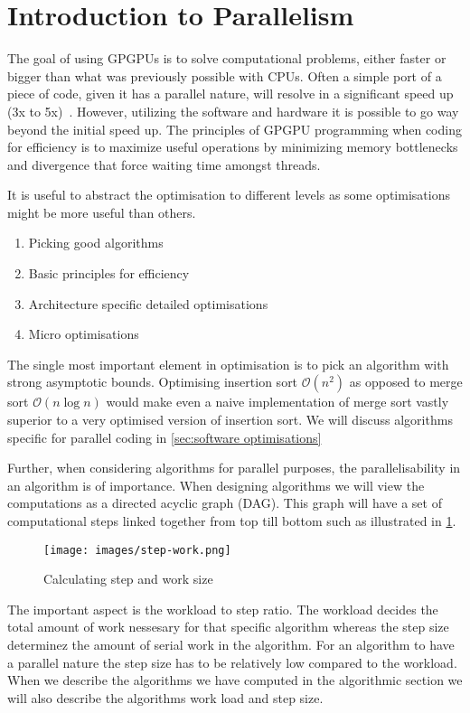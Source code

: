 \section{Introduction to Parallelism}
\label{sec:introduction to parallelism}
The goal of using GPGPUs is to solve computational problems, either faster or bigger than what was previously possible with CPUs.
Often a simple port of a piece of code, given it has a parallel nature, will resolve in a significant speed up (3x to 5x)~\cite{udacity}.
However, utilizing the software and hardware it is possible to go way beyond the initial speed up.
The principles of GPGPU programming when coding for efficiency is to maximize useful operations by minimizing memory bottlenecks and divergence that force waiting time amongst threads.

It is useful to abstract the optimisation to different levels as some optimisations might be more useful than others.

\begin{enumerate}
\item Picking good algorithms
\item Basic principles for efficiency
\item Architecture specific detailed optimisations
\item Micro optimisations
\end{enumerate}

The single most important element in optimisation is to pick an algorithm with strong asymptotic bounds.
Optimising insertion sort $\mathcal{O}(n^2)$ as opposed to merge sort $\mathcal{O}(n\log n)$ would make even a naive implementation of merge sort vastly superior to a very optimised version of insertion sort.
We will discuss algorithms specific for parallel coding in \cref{sec:software optimisations}

Further, when considering algorithms for parallel purposes, the parallelisability in an algorithm is of importance.
When designing algorithms we will view the computations as a directed acyclic graph (DAG).
This graph will have a set of computational steps linked together from top till bottom such as illustrated in \cref{fig:step and work}.

\begin{figure}[htb]
  \centering
  \texttt{[image: images/step-work.png]}
  \caption{Calculating step and work size}
  \label{fig:step and work}
\end{figure}

The important aspect is the workload to step ratio. The workload decides the total amount of work nessesary for that specific algorithm whereas the step size determinez the amount of serial work in the algorithm.
For an algorithm to have a parallel nature the step size has to be relatively low compared to the workload.
When we describe the algorithms we have computed in the algorithmic section we will also describe the algorithms work load and step size.

